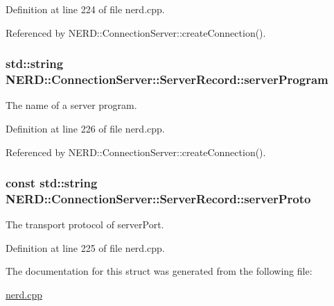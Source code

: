 \-Definition at line 224 of file nerd.\-cpp.



\-Referenced by \-N\-E\-R\-D\-::\-Connection\-Server\-::create\-Connection().

\hypertarget{structNERD_1_1ConnectionServer_1_1ServerRecord_a9bacaaa47cedda53feb069fbc1be8b8c}{
\subsubsection[{server\-Program}]{\setlength{\rightskip}{0pt plus 5cm}std\-::string {\bf \-N\-E\-R\-D\-::\-Connection\-Server\-::\-Server\-Record\-::server\-Program}}}
\label{structNERD_1_1ConnectionServer_1_1ServerRecord_a9bacaaa47cedda53feb069fbc1be8b8c}


\-The name of a server program. 



\-Definition at line 226 of file nerd.\-cpp.



\-Referenced by \-N\-E\-R\-D\-::\-Connection\-Server\-::create\-Connection().

\hypertarget{structNERD_1_1ConnectionServer_1_1ServerRecord_a8e253a76e9dbd9eaf239f09ff9d1e69f}{
\subsubsection[{server\-Proto}]{\setlength{\rightskip}{0pt plus 5cm}const std\-::string {\bf \-N\-E\-R\-D\-::\-Connection\-Server\-::\-Server\-Record\-::server\-Proto}}}
\label{structNERD_1_1ConnectionServer_1_1ServerRecord_a8e253a76e9dbd9eaf239f09ff9d1e69f}


\-The transport protocol of {\ttfamily server\-Port}. 



\-Definition at line 225 of file nerd.\-cpp.



\-The documentation for this struct was generated from the following file\-:\begin{DoxyCompactItemize}
\item 
\hyperlink{nerd_8cpp}{nerd.\-cpp}\end{DoxyCompactItemize}
